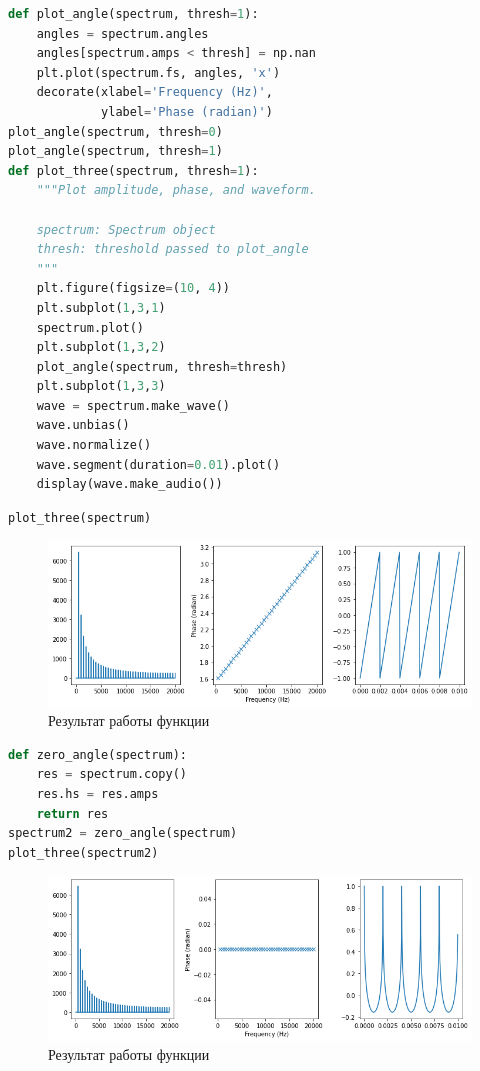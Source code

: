 \begin{lstlisting}[language=Python]
def plot_angle(spectrum, thresh=1):
    angles = spectrum.angles
    angles[spectrum.amps < thresh] = np.nan
    plt.plot(spectrum.fs, angles, 'x')
    decorate(xlabel='Frequency (Hz)', 
             ylabel='Phase (radian)')
plot_angle(spectrum, thresh=0)
plot_angle(spectrum, thresh=1)
def plot_three(spectrum, thresh=1):
    """Plot amplitude, phase, and waveform.
    
    spectrum: Spectrum object
    thresh: threshold passed to plot_angle
    """
    plt.figure(figsize=(10, 4))
    plt.subplot(1,3,1)
    spectrum.plot()
    plt.subplot(1,3,2)
    plot_angle(spectrum, thresh=thresh)
    plt.subplot(1,3,3)
    wave = spectrum.make_wave()
    wave.unbias()
    wave.normalize()
    wave.segment(duration=0.01).plot()
    display(wave.make_audio())
\end{lstlisting}

\begin{lstlisting}[language=Python]
plot_three(spectrum)
\end{lstlisting}
\begin{figure}[H]
	\begin{center}
		\includegraphics[scale=0.66]{fig/lab06/lab06_6.png}
		\caption{Результат работы функции}
	\end{center}
\end{figure}

\begin{lstlisting}[language=Python]
def zero_angle(spectrum):
    res = spectrum.copy()
    res.hs = res.amps
    return res
spectrum2 = zero_angle(spectrum)
plot_three(spectrum2)
\end{lstlisting}
\begin{figure}[H]
	\begin{center}
		\includegraphics[scale=0.66]{fig/lab06/lab06_7.png}
		\caption{Результат работы функции}
	\end{center}
\end{figure}

